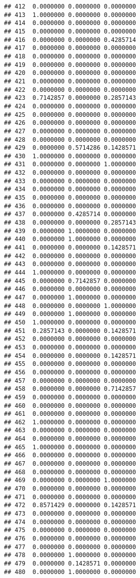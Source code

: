 \documentclass[
]{article}
\begin{document}
\begin{verbatim}
## 412  0.0000000 0.0000000 0.0000000
## 413  1.0000000 0.0000000 0.0000000
## 414  0.0000000 0.0000000 0.0000000
## 415  0.0000000 0.0000000 0.0000000
## 416  0.0000000 0.0000000 0.4285714
## 417  0.0000000 0.0000000 0.0000000
## 418  0.0000000 0.0000000 0.0000000
## 419  0.0000000 0.0000000 0.0000000
## 420  0.0000000 0.0000000 0.0000000
## 421  0.0000000 0.0000000 0.0000000
## 422  0.0000000 0.0000000 0.0000000
## 423  0.7142857 0.0000000 0.2857143
## 424  0.0000000 0.0000000 0.0000000
## 425  0.0000000 0.0000000 0.0000000
## 426  0.0000000 0.0000000 0.0000000
## 427  0.0000000 0.0000000 0.0000000
## 428  0.0000000 0.0000000 0.0000000
## 429  0.0000000 0.5714286 0.1428571
## 430  1.0000000 0.0000000 0.0000000
## 431  0.0000000 0.0000000 1.0000000
## 432  0.0000000 0.0000000 0.0000000
## 433  0.0000000 0.0000000 0.0000000
## 434  0.0000000 0.0000000 0.0000000
## 435  0.0000000 0.0000000 0.0000000
## 436  0.0000000 0.0000000 0.0000000
## 437  0.0000000 0.4285714 0.0000000
## 438  0.0000000 0.0000000 0.2857143
## 439  0.0000000 1.0000000 0.0000000
## 440  0.0000000 1.0000000 0.0000000
## 441  0.0000000 0.0000000 0.1428571
## 442  0.0000000 0.0000000 0.0000000
## 443  0.0000000 0.0000000 0.0000000
## 444  1.0000000 0.0000000 0.0000000
## 445  0.0000000 0.7142857 0.0000000
## 446  0.0000000 0.0000000 0.0000000
## 447  0.0000000 1.0000000 0.0000000
## 448  0.0000000 0.0000000 1.0000000
## 449  0.0000000 1.0000000 0.0000000
## 450  1.0000000 0.0000000 0.0000000
## 451  0.2857143 0.0000000 0.1428571
## 452  0.0000000 0.0000000 0.0000000
## 453  0.0000000 0.0000000 0.0000000
## 454  0.0000000 0.0000000 0.1428571
## 455  0.0000000 0.0000000 0.0000000
## 456  0.0000000 0.0000000 0.0000000
## 457  0.0000000 0.0000000 0.0000000
## 458  0.0000000 0.0000000 0.7142857
## 459  0.0000000 0.0000000 0.0000000
## 460  0.0000000 0.0000000 0.0000000
## 461  0.0000000 0.0000000 0.0000000
## 462  1.0000000 0.0000000 0.0000000
## 463  0.0000000 0.0000000 0.0000000
## 464  0.0000000 0.0000000 0.0000000
## 465  1.0000000 0.0000000 0.0000000
## 466  0.0000000 0.0000000 0.0000000
## 467  0.0000000 0.0000000 0.0000000
## 468  0.0000000 0.0000000 0.0000000
## 469  0.0000000 0.0000000 1.0000000
## 470  0.0000000 0.0000000 0.0000000
## 471  0.0000000 0.0000000 0.0000000
## 472  0.8571429 0.0000000 0.1428571
## 473  0.0000000 0.0000000 0.0000000
## 474  0.0000000 0.0000000 0.0000000
## 475  0.0000000 0.0000000 0.0000000
## 476  0.0000000 0.0000000 0.0000000
## 477  0.0000000 0.0000000 0.0000000
## 478  0.0000000 1.0000000 0.0000000
## 479  0.0000000 0.1428571 0.0000000
## 480  0.0000000 1.0000000 0.0000000

\end{verbatim}
\end{document}

